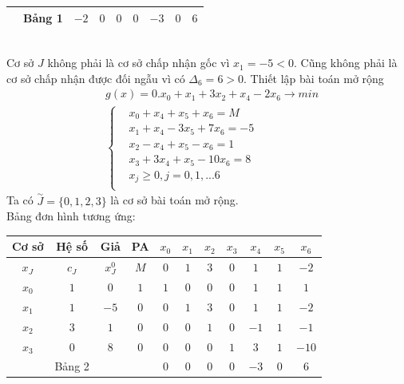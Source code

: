 \documentclass[12pt,a4paper]{report}
\begin{document}
\begin{itemize}
\begin{tabular}{|c|c|c|c|c|c|c|c|c|}
         \hline
         &Bảng 1& $-2$ &$0$ &$0$ &$0$ &$-3$ &$0$ &$6$\\
         \hline
    \end{tabular}\\
    Cơ sở $J$ không phải là cơ sở chấp nhận gốc vì $x_1=-5 <0$. Cũng không phải là cơ sở chấp nhận được đối ngẫu vì có $\Delta_6=6>0.$
    Thiết lập bài toán mở rộng\\
    \begin{equation*}
        \begin{split}
            &g(x)=0.x_0+x_1+3x_2+x_4 -2x_6 \to min\\
            &\left\{\begin{split}
                &x_0 +x_4+x_5+x_6=M \\           
                &x_1+   x_4-3x_5+7x_6=-5\\
                &   x_2-x_4+x_5-x_6=1\\
                &x_3+3x_4+x_5-10x_6=8\\
                &x_j \ge 0, j=0,1,...6\\
            \end{split}\right.
        \end{split}
    \end{equation*}
    Ta có $\overset{\sim}{J}=\{0,1,2,3\}$ là cơ sở bài toán mở rộng.\\

    Bảng đơn hình tương ứng:\\
    \begin{tabular}{|c|c|c|c|c|c|c|c|c|c|c|}
    \hline
         Cơ sở &Hệ số &Giả &PA &$x_0$&$x_1$ & $x_2$ &$x_3$ &$x_4$ & $x_5$ &$x_6$ \\
         \hline
         $x_J$ &$c_J$& $x_J^0$ &$M$ &$0$ &$1$ &$3$ &$0$ &$1$ &$1$ &$-2$\\
         \hline
         $x_0$ &$1$ &$0$ &$1$ &$1$ &$0$ &$0$ &$0$ &$1$ &$1$ &$1$\\
         $x_1$ &$1$ &$-5$ &$0$ & $0$ &$1$ &$3$ &$0$ &$1$ &$1$ &$-2$\\
         $x_2$ & $3$ &$1$ &$0$ &$0$ &$0$ &$1$ &$0$ &$-1$ &$1$ &$-1$\\
         $x_3$ &$0$ &$8$ &$0$ &$0$ &$0$ &$0$ &$1$ &$3$ &$1$ &$-10$\\
         \hline
         &Bảng 2& &&$0$ &$0$ &$0$ &$0$ &$-3$ &$0$ &$6$\\
         \hline
    \end{tabular}\\
    

\end{itemize}
\end{document}

